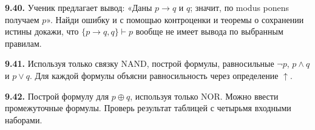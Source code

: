 \noindent\begin{minipage}[t]{\linewidth}\textbf{9.40.} Ученик предлагает вывод: «Даны \(p\to q\) и \(q\); значит, по modus ponens получаем \(p\)». Найди ошибку и с помощью контроценки и теоремы о сохранении истины докажи, что \(\{p\to q,q\}\vdash p\) вообще не имеет вывода по выбранным правилам.\par\end{minipage}\par
\noindent\begin{minipage}[t]{\linewidth}\textbf{9.41.}\starmark{} Используя только связку NAND, построй формулы, равносильные \(\neg p\), \(p\land q\) и \(p\lor q\). Для каждой формулы объясни равносильность через определение \(\uparrow\).\par\end{minipage}\par
\noindent\begin{minipage}[t]{\linewidth}\textbf{9.42.}\starmark{} Построй формулу для \(p\oplus q\), используя только NOR. Можно ввести промежуточные формулы. Проверь результат таблицей с четырьмя входными наборами.\par\end{minipage}\par
\endgroup
